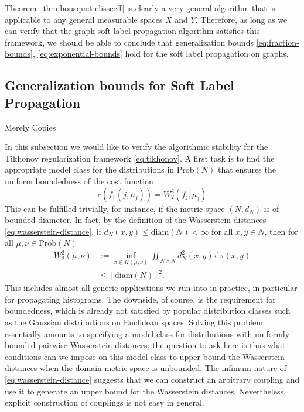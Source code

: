 \documentclass[letterpaper]{article} %
\begin{document}
Theorem~\ref{thm:bousquet-elisseeff} is clearly a very general algorithm that is applicable to any general measurable spaces $X$ and $Y$. Therefore, as long as we can verify that the graph soft label propagation algorithm satisfies this framework, we should be able to conclude that generalization bounds \eqref{eq:fraction-bounds}, \eqref{eq:exponential-bounds} hold for the soft label propagation on graphs.




\subsection{Generalization bounds for Soft Label Propagation} 
{\color{red}Merely Copies}

In this subsection we would like to verify the algorithmic stability for the Tikhonov regularization framework \eqref{eq:tikhonov}. A first task is to find the appropriate model class for the distributions in $\mathrm{Prob}\left( N \right)$ that ensures the uniform boundedness of the cost function
\begin{equation}
  \label{eq:wasserstein-cost-func}
    c\left( f, \left( j,\mu_j \right) \right)=W_2^2 \left( f_j,\mu_j \right)
\end{equation}
This can be fulfilled trivially, for instance, if the metric space $\left( N,d_N \right)$ is of bounded diameter. In fact, by the definition of the Wasserstein distances \eqref{eq:wasserstein-distance}, if $d_N \left( x,y \right)\leq \mathrm{diam}\left( N \right)<\infty$ for all $x,y\in N$, then for all $\mu,\nu\in \mathrm{Prob}\left( N \right)$
\begin{equation*}
  \begin{aligned}
      W_2^2 \left( \mu,\nu \right)&:=\inf_{\pi\in\Pi \left( \mu,\nu \right)}\iint_{N\times N}d^2_N \left( x,y \right)\,\mathrm{d}\pi \left( x,y \right)\\
    &\leq \left[\mathrm{diam}\left( N \right)\right]^2.
  \end{aligned}
\end{equation*}
This includes almost all generic applications we run into in practice, in particular for propagating histograms. The downside, of course, is the requirement for boundedness, which is already not satisfied by popular distribution classes such as the Gaussian distributions on Euclidean spaces. Solving this problem essentially amounts to specifying a model class for distributions with uniformly bounded pairwise Wasserstein distances; the question to ask here is thus what conditions can we impose on this model class to upper bound the Wasserstein distances when the domain metric space is unbounded. The infimum nature of \eqref{eq:wasserstein-distance} suggests that we can construct an arbitrary coupling and use it to generate an upper bound for the Wasserstein distances. Nevertheless, explicit construction of couplings is not easy in general.
\end{document}
